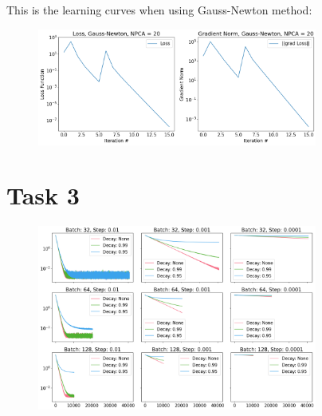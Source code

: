 \documentclass[12pt]{article}
\begin{document}
This is the learning curves when using Gauss-Newton method:
\begin{figure}[ht]
    \centering
    \includegraphics[width=0.82\textwidth]{./imgs/gauss_newton.png}
\end{figure}


\section*{Task 3}

\begin{figure}[ht]
    \centering
    \includegraphics[width=0.82\textwidth]{./imgs/SGD.png}
\end{figure}
\end{document}
